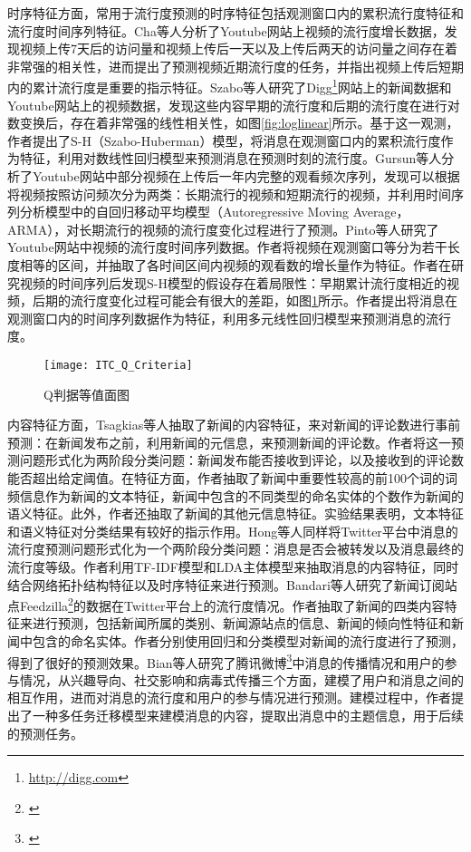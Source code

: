 时序特征方面，常用于流行度预测的时序特征包括观测窗口内的累积流行度特征和流行度时间序列特征。Cha等人\citep{chen2005zhulu}分析了Youtube网站上视频的流行度增长数据，发现视频上传7天后的访问量和视频上传后一天以及上传后两天的访问量之间存在着非常强的相关性，进而提出了预测视频近期流行度的任务，并指出视频上传后短期内的累计流行度是重要的指示特征。Szabo等人\citep{chen2005zhulu}研究了Digg\footnote{\url{http://digg.com}}网站上的新闻数据和Youtube网站上的视频数据，发现这些内容早期的流行度和后期的流行度在进行对数变换后，存在着非常强的线性相关性，如图\ref{fig:loglinear}所示。基于这一观测，作者提出了S-H（Szabo-Huberman）模型，将消息在观测窗口内的累积流行度作为特征，利用对数线性回归模型来预测消息在预测时刻的流行度。Gursun等人\citep{chen2005zhulu}分析了Youtube网站中部分视频在上传后一年内完整的观看频次序列，发现可以根据将视频按照访问频次分为两类：长期流行的视频和短期流行的视频，并利用时间序列分析模型中的自回归移动平均模型（Autoregressive Moving Average，ARMA）\citep{chen2005zhulu}，对长期流行的视频的流行度变化过程进行了预测。Pinto等人\citep{chen2005zhulu}研究了Youtube网站中视频的流行度时间序列数据。作者将视频在观测窗口等分为若干长度相等的区间，并抽取了各时间区间内视频的观看数的增长量作为特征。作者在研究视频的时间序列后发现S-H模型的假设存在着局限性：早期累计流行度相近的视频，后期的流行度变化过程可能会有很大的差距，如图\ref{fig:pinto}所示。作者提出将消息在观测窗口内的时间序列数据作为特征，利用多元线性回归模型来预测消息的流行度。
\begin{figure}[!htbp]
  \centering
  \texttt{[image: ITC\_Q\_Criteria]}
  \caption{Q判据等值面图}
  \label{fig:pinto}
\end{figure}

内容特征方面，Tsagkias等人\citep{chen2005zhulu}抽取了新闻的内容特征，来对新闻的评论数进行事前预测：在新闻发布之前，利用新闻的元信息，来预测新闻的评论数。作者将这一预测问题形式化为两阶段分类问题：新闻发布能否接收到评论，以及接收到的评论数能否超出给定阈值。在特征方面，作者抽取了新闻中重要性较高的前100个词的词频信息作为新闻的文本特征，新闻中包含的不同类型的命名实体的个数作为新闻的语义特征。此外，作者还抽取了新闻的其他元信息特征。实验结果表明，文本特征和语义特征对分类结果有较好的指示作用。Hong等人\citep{chen2005zhulu}同样将Twitter平台中消息的流行度预测问题形式化为一个两阶段分类问题：消息是否会被转发以及消息最终的流行度等级。作者利用TF-IDF模型和LDA主体模型\citep{chen2005zhulu}来抽取消息的内容特征，同时结合网络拓扑结构特征以及时序特征来进行预测。Bandari等人\citep{chen2005zhulu}研究了新闻订阅站点Feedzilla\footnote{\url{}}的数据在Twitter平台上的流行度情况。作者抽取了新闻的四类内容特征来进行预测，包括新闻所属的类别、新闻源站点的信息、新闻的倾向性特征和新闻中包含的命名实体。作者分别使用回归和分类模型对新闻的流行度进行了预测，得到了很好的预测效果。Bian等人\citep{chen2005zhulu}研究了腾讯微博\footnote{\url{}}中消息的传播情况和用户的参与情况，从兴趣导向、社交影响和病毒式传播三个方面，建模了用户和消息之间的相互作用，进而对消息的流行度和用户的参与情况进行预测。建模过程中，作者提出了一种多任务迁移模型来建模消息的内容，提取出消息中的主题信息，用于后续的预测任务。

